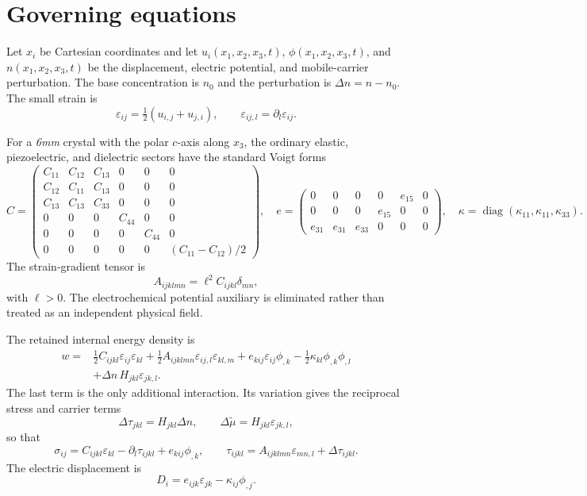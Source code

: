 \section{Governing equations}\label{sec:governing}

Let \(x_i\) be Cartesian coordinates and let \(u_i(x_1,x_2,x_3,t)\),
\(\phi(x_1,x_2,x_3,t)\), and \(n(x_1,x_2,x_3,t)\) be the displacement, electric
potential, and mobile-carrier perturbation. The base concentration is \(n_0\) and
the perturbation is \(\Delta n=n-n_0\). The small strain is
\[
\varepsilon_{ij}=\tfrac12(u_{i,j}+u_{j,i}),
\qquad
\varepsilon_{ij,l}=\partial_l\varepsilon_{ij}.
\]

For a \textit{6mm} crystal with the polar \(c\)-axis along \(x_3\), the ordinary
elastic, piezoelectric, and dielectric sectors have the standard Voigt forms
\[
C=\begin{pmatrix}
C_{11}&C_{12}&C_{13}&0&0&0\\
C_{12}&C_{11}&C_{13}&0&0&0\\
C_{13}&C_{13}&C_{33}&0&0&0\\
0&0&0&C_{44}&0&0\\
0&0&0&0&C_{44}&0\\
0&0&0&0&0&(C_{11}-C_{12})/2
\end{pmatrix},\quad
e=\begin{pmatrix}
0&0&0&0&e_{15}&0\\
0&0&0&e_{15}&0&0\\
e_{31}&e_{31}&e_{33}&0&0&0
\end{pmatrix},\quad
\kappa=\operatorname{diag}(\kappa_{11},\kappa_{11},\kappa_{33}).
\]
The strain-gradient tensor is
\[
A_{ijklmn}=\ell^2C_{ijkl}\delta_{mn},
\]
with \(\ell>0\). The electrochemical potential auxiliary is eliminated rather than
treated as an independent physical field.

The retained internal energy density is
\[
\begin{aligned}
w=&\tfrac12C_{ijkl}\varepsilon_{ij}\varepsilon_{kl}
+\tfrac12A_{ijklmn}\varepsilon_{ij,l}\varepsilon_{kl,m}
+e_{kij}\varepsilon_{ij}\phi_{,k}
-\tfrac12\kappa_{kl}\phi_{,k}\phi_{,l}\\
&+\Delta n\,H_{jkl}\varepsilon_{jk,l}.
\end{aligned}
\]
The last term is the only additional interaction. Its variation gives the reciprocal
stress and carrier terms
\[
\Delta\tau_{jkl}=H_{jkl}\Delta n,
\qquad
\Delta\widetilde{\mu}=H_{jkl}\varepsilon_{jk,l},
\]
so that
\[
\sigma_{ij}=C_{ijkl}\varepsilon_{kl}
-\partial_l\tau_{ijkl}
+e_{kij}\phi_{,k},
\qquad
\tau_{ijkl}=A_{ijklmn}\varepsilon_{mn,l}+\Delta\tau_{ijkl}.
\]
The electric displacement is
\[
D_i=e_{ijk}\varepsilon_{jk}-\kappa_{ij}\phi_{,j}.
\]

